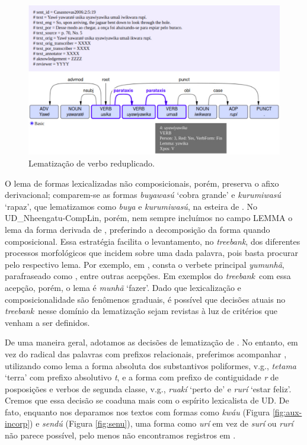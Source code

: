 \documentclass[portuguese]{textolivre}
\newcommand{\wt}[2]{\textit{#1} `#2'}
\newcommand{\tbc}{UD\_Nheengatu-CompLin}
\newcommand{\tb}{\textit{treebank}}
\begin{document}
\begin{figure}[htbp]
  \centering
  \begin{minipage}{.75\textwidth}
    \includegraphics[width=\linewidth]{figures/redup.pdf}
    \caption{Lematização de verbo reduplicado.}
    \label{fig:redup}
  \end{minipage}
\end{figure}

O lema de formas lexicalizadas não composicionais, porém, preserva o afixo derivacional; comparem-se as formas \wt{buyawasú}{cobra grande} e \wt{kurumiwasú}{rapaz}, que lematizamos como \textit{buya} e \textit{kurumiwasú}, na esteira de \textcite{avila2021}. No \tbc, porém, nem sempre incluímos no campo LEMMA o lema da forma derivada de \textcite{avila2021}, preferindo a decomposição da forma quando composicional. Essa estratégia facilita o levantamento, no \tb, dos diferentes processos morfológicos que incidem sobre uma dada palavra, pois basta procurar pelo respectivo lema. Por exemplo, em \textcite{avila2021}, consta o verbete principal \textit{yumunhã}, parafraseado como , entre outras acepções. Em exemplos do \tb~com essa acepção, porém, o lema é \wt{munhã}{fazer}. Dado que lexicalização e composicionalidade são fenômenos graduais, é possível que decisões atuais no \tb~nesse domínio da lematização sejam revistas à luz de critérios que venham a ser definidos. 

De uma maneira geral, adotamos as decisões de lematização de \textcite{avila2021}. No entanto, em vez do radical das palavras com prefixos relacionais, preferimos acompanhar \textcite{navarro2016}, utilizando como lema a forma absoluta dos substantivos poliformes, v.g., \wt{tetama}{terra} com prefixo absolutivo \textit{t}, e a forma com prefixo de contiguidade \textit{r} de posposições e verbos de segunda classe, v.g., \wt{ruakí}{perto de} e \wt{rurí}{estar feliz}. Cremos que essa decisão se coaduna mais com o espírito lexicalista de UD. De fato, enquanto nos deparamos nos textos com formas como \textit{kwáu} (Figura \ref{fig:aux-incorp}) e \textit{sendú} (Figura \ref{fig:senu}), uma forma como \textit{urí} em vez de \textit{surí} ou \textit{rurí} não parece possível, pelo menos não encontramos registros em \textcite{avila2021}.
\end{document}
